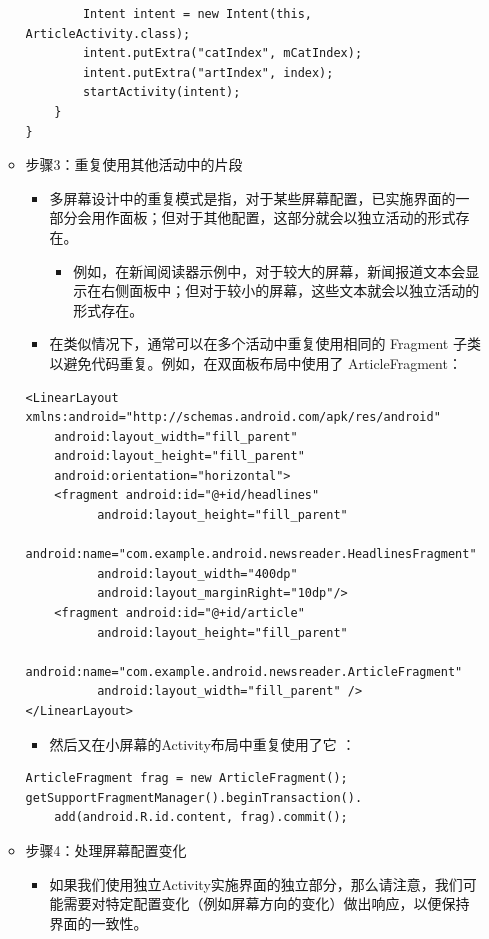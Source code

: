 \documentclass[9pt, b5paper]{article}
\begin{document}
\begin{enumerate}
\begin{itemize}
\begin{verbatim}
        Intent intent = new Intent(this, ArticleActivity.class);
        intent.putExtra("catIndex", mCatIndex);
        intent.putExtra("artIndex", index);
        startActivity(intent);
    }
}
\end{verbatim}
\item 步骤3：重复使用其他活动中的片段
\begin{itemize}
\item 多屏幕设计中的重复模式是指，对于某些屏幕配置，已实施界面的一部分会用作面板；但对于其他配置，这部分就会以独立活动的形式存在。
\begin{itemize}
\item 例如，在新闻阅读器示例中，对于较大的屏幕，新闻报道文本会显示在右侧面板中；但对于较小的屏幕，这些文本就会以独立活动的形式存在。
\end{itemize}
\item 在类似情况下，通常可以在多个活动中重复使用相同的 Fragment 子类以避免代码重复。例如，在双面板布局中使用了 ArticleFragment：
\end{itemize}
\begin{verbatim}
<LinearLayout xmlns:android="http://schemas.android.com/apk/res/android"
    android:layout_width="fill_parent"
    android:layout_height="fill_parent"
    android:orientation="horizontal">
    <fragment android:id="@+id/headlines"
          android:layout_height="fill_parent"
          android:name="com.example.android.newsreader.HeadlinesFragment"
          android:layout_width="400dp"
          android:layout_marginRight="10dp"/>
    <fragment android:id="@+id/article"
          android:layout_height="fill_parent"
          android:name="com.example.android.newsreader.ArticleFragment"
          android:layout_width="fill_parent" />
</LinearLayout>
\end{verbatim}
\begin{itemize}
\item 然后又在小屏幕的Activity布局中重复使用了它 ：
\end{itemize}
\begin{verbatim}
ArticleFragment frag = new ArticleFragment();
getSupportFragmentManager().beginTransaction().
    add(android.R.id.content, frag).commit();
\end{verbatim}
\item 步骤4：处理屏幕配置变化
\begin{itemize}
\item 如果我们使用独立Activity实施界面的独立部分，那么请注意，我们可能需要对特定配置变化（例如屏幕方向的变化）做出响应，以便保持界面的一致性。

\end{itemize}
\end{itemize}
\end{enumerate}
\end{document}
